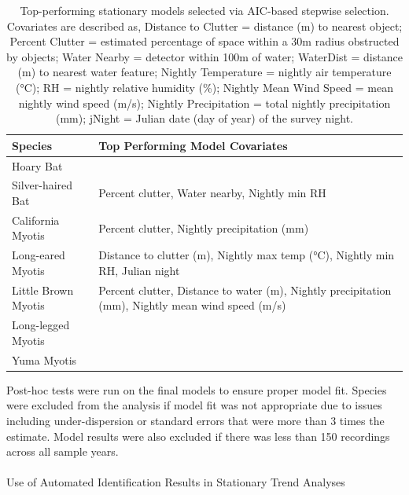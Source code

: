 \documentclass[
  letterpaper,
  DIV=11,
  numbers=noendperiod]{scrartcl}
\makeatletter
\let\oldparagraph\paragraph
\renewcommand{\paragraph}{
    \@ifstar
      \xxxParagraphStar
      \xxxParagraphNoStar
  }
\newcommand{\xxxParagraphStar}[1]{\oldparagraph*{#1}\mbox{}}
\newcommand{\xxxParagraphNoStar}[1]{\oldparagraph{#1}\mbox{}}
\makeatother
\begin{document}
\begin{longtable}[l]{>{\raggedright\arraybackslash}p{15em}>{\raggedright\arraybackslash}p{25em}}

\caption{\label{tbl-cov}Top-performing stationary models selected via
AIC-based stepwise selection. Covariates are described as, Distance to
Clutter = distance (m) to nearest object; Percent Clutter = estimated
percentage of space within a 30m radius obstructed by objects; Water
Nearby = detector within 100m of water; WaterDist = distance (m) to
nearest water feature; Nightly Temperature = nightly air temperature
(°C); RH = nightly relative humidity (\%); Nightly Mean Wind Speed =
mean nightly wind speed (m/s); Nightly Precipitation = total nightly
precipitation (mm); jNight = Julian date (day of year) of the survey
night.}

\tabularnewline

\toprule
Species & Top Performing Model Covariates\\
\midrule
Hoary Bat & \\
Silver-haired Bat & Percent clutter, Water nearby, Nightly min RH\\
California Myotis & Percent clutter, Nightly precipitation (mm)\\
Long-eared Myotis & Distance to clutter (m), Nightly max temp (°C), Nightly min RH, Julian night\\
Little Brown Myotis & Percent clutter, Distance to water (m), Nightly precipitation (mm), Nightly mean wind speed (m/s)\\
\addlinespace
Long-legged Myotis & \\
Yuma Myotis & \\
\bottomrule

\end{longtable}

Post-hoc tests were run on the final models to ensure proper model fit.
Species were excluded from the analysis if model fit was not appropriate
due to issues including under-dispersion or standard errors that were
more than 3 times the estimate. Model results were also excluded if
there was less than 150 recordings across all sample years.

\paragraph{Use of Automated Identification Results in Stationary Trend
Analyses}\label{use-of-automated-identification-results-in-stationary-trend-analyses}
\end{document}
